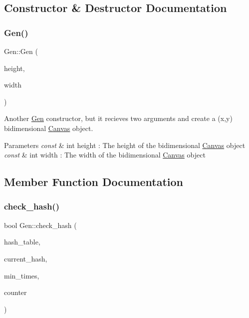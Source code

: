\subsection{Constructor \& Destructor Documentation}
\mbox{\label{class_gen_a4f0a5bc8aef4821c976a850f3f94307b}} 
\subsubsection{\texorpdfstring{Gen()}{Gen()}}
{\footnotesize\ttfamily Gen\+::\+Gen (\begin{DoxyParamCaption}\item[{const int}]{height,  }\item[{const int}]{width }\end{DoxyParamCaption})}



Another \mbox{\hyperlink{class_gen}{Gen}} constructor, but it recieves two arguments and create a (x,y) bidimensional \mbox{\hyperlink{class_canvas}{Canvas}} object. 


\begin{DoxyParams}{Parameters}
{\em const} & int height \+: The height of the bidimensional \mbox{\hyperlink{class_canvas}{Canvas}} object \\
\hline
{\em const} & int width \+: The width of the bidimensional \mbox{\hyperlink{class_canvas}{Canvas}} object \\
\hline
\end{DoxyParams}


\subsection{Member Function Documentation}
\mbox{\label{class_gen_a5886e4217cee1c1ad080e23134e8210a}} 
\subsubsection{\texorpdfstring{check\+\_\+hash()}{check\_hash()}}
{\footnotesize\ttfamily bool Gen\+::check\+\_\+hash (\begin{DoxyParamCaption}\item[{std\+::vector$<$ std\+::string $>$ \&}]{hash\+\_\+table,  }\item[{std\+::string}]{current\+\_\+hash,  }\item[{size\+\_\+t}]{min\+\_\+times,  }\item[{size\+\_\+t \&}]{counter }\end{DoxyParamCaption})}



